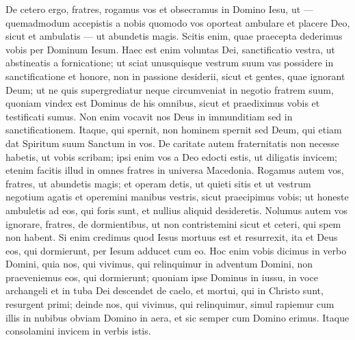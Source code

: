 \begin{biblechapter}  
\verse De cetero ergo, fratres, rogamus vos et obsecramus in Domino Iesu, ut — quemadmodum accepistis a nobis quomodo vos oporteat ambulare et placere Deo, sicut et ambulatis — ut abundetis magis. 
\verse Scitis enim, quae praecepta dederimus vobis per Dominum Iesum. 
\verse Haec est enim voluntas Dei, sanctificatio vestra, 
\verse ut abstineatis a fornicatione; ut sciat unusquisque vestrum suum vas possidere in sanctificatione et honore, 
\verse non in passione desiderii, sicut et gentes, quae ignorant Deum; 
\verse ut ne quis supergrediatur neque circumveniat in negotio fratrem suum, quoniam vindex est Dominus de his omnibus, sicut et praediximus vobis et testificati sumus. 
\verse Non enim vocavit nos Deus in immunditiam sed in sanctificationem. 
\verse Itaque, qui spernit, non hominem spernit sed Deum, qui etiam dat Spiritum suum Sanctum in vos. 
\verse De caritate autem fraternitatis non necesse habetis, ut vobis scribam; ipsi enim vos a Deo edocti estis, ut diligatis invicem; 
\verse etenim facitis illud in omnes fratres in universa Macedonia. Rogamus autem vos, fratres, ut abundetis magis; 
\verse et operam detis, ut quieti sitis et ut vestrum negotium agatis et operemini manibus vestris, sicut praecipimus vobis; 
\verse ut honeste ambuletis ad eos, qui foris sunt, et nullius aliquid desideretis. 
\verse Nolumus autem vos ignorare, fratres, de dormientibus, ut non contristemini sicut et ceteri, qui spem non habent. 
\verse Si enim credimus quod Iesus mortuus est et resurrexit, ita et Deus eos, qui dormierunt, per Iesum adducet cum eo.  
\verse Hoc enim vobis dicimus in verbo Domini, quia nos, qui vivimus, qui relinquimur in adventum Domini, non praeveniemus eos, qui dormierunt; 
\verse quoniam ipse Dominus in iussu, in voce archangeli et in tuba Dei descendet de caelo, et mortui, qui in Christo sunt, resurgent primi; 
\verse deinde nos, qui vivimus, qui relinquimur, simul rapiemur cum illis in nubibus obviam Domino in aera, et sic semper cum Domino erimus. 
\verse Itaque consolamini invicem in verbis istis. 
\end{biblechapter}

